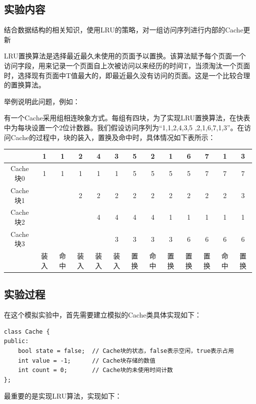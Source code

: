 \documentclass[UTF8,12pt]{article}
\begin{document}
\subsection{实验内容}
结合数据结构的相关知识，使用LRU的策略，对一组访问序列进行内部的Cache更新

LRU置换算法是选择最近最久未使用的页面予以置换。该算法赋予每个页面一个访问字段，用来记录一个页面自上次被访问以来经历的时间T，当须淘汰一个页面时，选择现有页面中T值最大的，即最近最久没有访问的页面。这是一个比较合理的置换算法。

举例说明此问题，例如：

有一个Cache采用组相连映象方式。每组有四块，为了实现LRU置换算法，在快表中为每块设置一个2位计数器。我们假设访问序列为“1,1,2,4,3,5
,2,1,6,7,1,3”。在访问Cache的过程中，块的装入，置换及命中时，具体情况如下表所示：

\begin{table}[htbp]
    \begin{tabular}{ccccccccccccc}
    \hline
            & 1  & 1  & 2  & 4  & 3  & 5  & 2  & 1  & 6  & 7  & 1  & 3  \\ \hline
    Cache块0 & 1  & 1  & 1  & 1  & 1  & 5  & 5  & 5  & 5  & 7  & 7  & 7  \\
    Cache块1 &    &    & 2  & 2  & 2  & 2  & 2  & 2  & 2  & 2  & 2  & 3  \\
    Cache块2 &    &    &    & 4  & 4  & 4  & 4  & 1  & 1  & 1  & 1  & 1  \\
    Cache块3 &    &    &    &    & 3  & 3  & 3  & 3  & 6  & 6  & 6  & 6  \\
            & 装入 & 命中 & 装入 & 装入 & 装入 & 置换 & 命中 & 置换 & 置换 & 置换 & 命中 & 置换 \\ \hline
    \end{tabular}
\end{table}

\subsection{实验过程}
在这个模拟实验中，首先需要建立模拟的Cache类具体实现如下：

\begin{lstlisting}[frame=shadowbox] 
    class Cache {
public:
    bool state = false;  // Cache块的状态，false表示空闲，true表示占用
    int value = -1;      // Cache块存储的数值
    int count = 0;       // Cache块的未使用时间计数
};
\end{lstlisting}

最重要的是实现LRU算法，实现如下：
\end{document}
